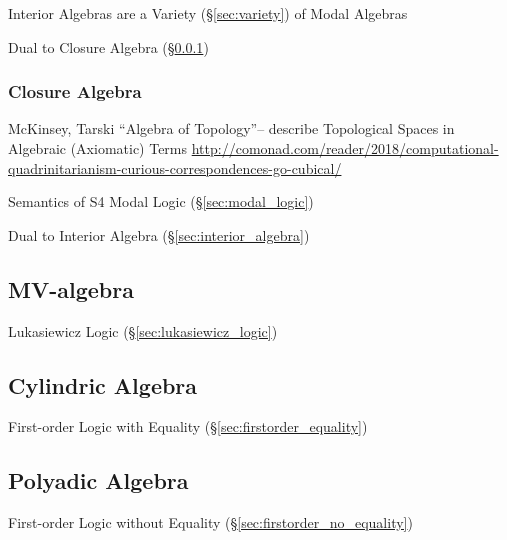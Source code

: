 Interior Algebras are a Variety (\S\ref{sec:variety}) of Modal Algebras

Dual to Closure Algebra (\S\ref{sec:closure_algebra})



\subsubsection{Closure Algebra}\label{sec:closure_algebra}

McKinsey, Tarski ``Algebra of Topology''-- describe Topological Spaces in
Algebraic (Axiomatic) Terms
\url{http://comonad.com/reader/2018/computational-quadrinitarianism-curious-correspondences-go-cubical/}

Semantics of S4 Modal Logic (\S\ref{sec:modal_logic})

Dual to Interior Algebra (\S\ref{sec:interior_algebra})



\subsection{MV-algebra}\label{sec:mv_algebra}

Lukasiewicz Logic (\S\ref{sec:lukasiewicz_logic})



\subsection{Cylindric Algebra}\label{sec:cylindric_algebra}

First-order Logic with Equality (\S\ref{sec:firstorder_equality})



\subsection{Polyadic Algebra}\label{sec:polyadic_algebra}

First-order Logic without Equality
(\S\ref{sec:firstorder_no_equality})



